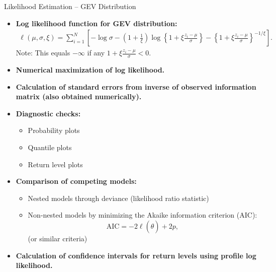 \documentclass[10pt, hyperref={colorlinks = true,linkcolor = blue}]{beamer}
\begin{document}
{{\begin{frame}{Likelihood Estimation -- GEV Distribution}
 \footnotesize
\begin{itemize}
    \item \textbf{Log likelihood function for GEV distribution:}
    \begin{align*}
    \ell(\mu, \sigma, \xi) = \sum_{i=1}^{N} \left[ -\log \sigma - \left(1 + \frac{1}{\xi}\right) \log \left\{1 + \xi \frac{z_i - \mu}{\sigma}\right\} - \left\{1 + \xi \frac{z_i - \mu}{\sigma}\right\}^{-1/\xi} \right].
      \end{align*}
    Note: This equals $-\infty$ if any $1 + \xi \frac{z_i - \mu}{\sigma} < 0$.
    
    \item \textbf{Numerical maximization of log likelihood.}
    
    \item \textbf{Calculation of standard errors from inverse of observed information matrix (also obtained numerically).}
    
    \item \textbf{Diagnostic checks:}
    \begin{itemize}
        \item Probability plots
        \item Quantile plots
        \item Return level plots
    \end{itemize}
    
    \item \textbf{Comparison of competing models:}
    \begin{itemize}
        \item Nested models through deviance (likelihood ratio statistic)
        \item Non-nested models by minimizing the Akaike information criterion (AIC):
        \[
        \text{AIC} = -2\ell(\hat{\theta}) + 2p,
        \]
        (or similar criteria)
    \end{itemize}
    
    \item \textbf{Calculation of confidence intervals for return levels using profile log likelihood.}
\end{itemize}

\end{frame}



}}
\end{document}
